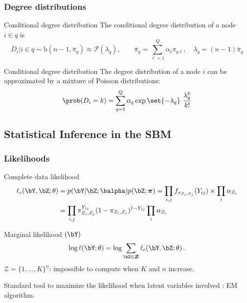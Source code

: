 \documentclass{beamer}\usepackage[]{graphicx}\usepackage[]{color}
\begin{document}
\begin{frame}
  \frametitle{Degree distributions}

  \begin{block}{Conditional degree distribution}
    The conditional degree distribution of a node $i\in q$ is
    \begin{equation*}
      D_i | i \in q \sim \mathrm{b}(n-1,\bar\pi_q) \approx \mathcal{P}(\lambda_q), \qquad \bar\pi_q = \sum_{\ell=1}^Q \alpha_\ell \pi_{q\ell}, \quad \lambda_q = (n-1)\bar\pi_q
    \end{equation*}
  \end{block}

  \vfill

  \begin{block}{Conditional degree distribution}
    The degree distribution of a node $i$ can be approximated by a mixture of Poisson distributions:
    \begin{equation*}
      \prob(D_i = k) = \sum_{q=1}^Q\alpha_q \exp{\set{-\lambda_q}} \ \frac{\lambda_q^k}{k !}
    \end{equation*}
  \end{block}

\end{frame}

\subsection{Statistical Inference in the SBM}

\begin{frame}
  \frametitle{Likelihoods}

\begin{block}{Complete data likelihood}
\vspace{-.5cm}
 \begin{align*}
\ell_c(\bY,\bZ; \theta)  & =  p(\bY | \bZ; \balpha) p(\bZ ; \boldsymbol\pi)\nonumber = \prod_{i,j} f_{\pi_{Z_i,Z_j}}(Y_{ij}) \times   \prod_{i} \alpha_{Z_i} \nonumber  \\
&=  \prod_{i,j} \pi_{Z_i,Z_j}^{Y_{ij}} (1-  \pi_{Z_i,Z_j})^{1- Y_{ij}}    \prod_{i} \alpha_{Z_i} \nonumber
\end{align*}
 \end{block}
 
\begin{block}{Marginal likelihood $(\bY)$}
\vspace{-.5cm}
\begin{equation*}
\log \ell(\bY; \theta) =\log \sum_{\bZ \in \boldsymbol{\mathcal{Z}}} \ell_c(\bY,\bZ; \theta) \,.
\end{equation*}
$\boldsymbol{\mathcal{Z}} =   \{1,\dots, K\}^{n}$: impossible to compute  when  $K$ and $n$ increase. 
\end{block}

\vfill

\alert{Standard tool to maximize the likelihood when latent variables involved} : EM  algorithm.  
 
 \end{frame}
\end{document}
